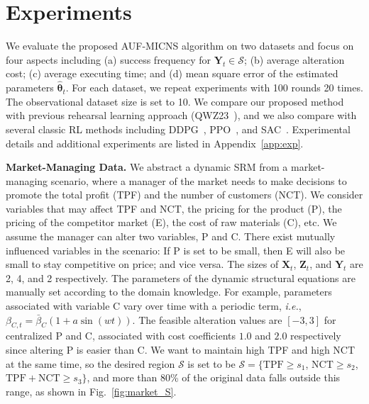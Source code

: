 \documentclass{article}
\theoremstyle{plain}
\theoremstyle{definition}
\theoremstyle{remark}
\def \ie {\textit{i.e.}}
\def \Fig {Fig.}
\def \Z {\mathbf{Z}}
\def \sS {\mathcal{S}}
\def \X {\mathbf{X}}
\def \Y {\mathbf{Y}}
\begin{document}
\section{Experiments}
\label{sec:exper}

We evaluate the proposed AUF-MICNS algorithm on two datasets and focus on four aspects including 
(a) success frequency for $\Y_t\in \sS$; 
(b) average alteration cost; 
(c) average executing time; and
(d) mean square error of the estimated parameters $\hat{\bm{\theta}}_t$. 
For each dataset, we repeat experiments with 100 rounds 20 times. 
The observational dataset size is set to 10. 
We compare our proposed method with previous rehearsal learning approach (QWZ23~\citep{qint2023srm}), 
and we also compare with several classic RL methods including 
DDPG~\citep{Lillicrap2016ddpg}, 
PPO~\citep{John2017PPO}, 
and SAC~\citep{haarnoja2018SAC}.
Experimental details and additional experiments are listed in Appendix~\ref{app:exp}.

\textbf{Market-Managing Data.} 
We abstract a dynamic SRM from a market-managing scenario, where a manager of the market needs to make decisions to promote the total profit (TPF) and the number of customers (NCT). 
We consider variables that may affect TPF and NCT, the pricing for the product (P), the pricing of the competitor market (E), the cost of raw materials (C), etc. 
We assume the manager can alter two variables, P and C.
There exist mutually influenced variables in the scenario: If P is set to be small, then E will also be small to stay competitive on price; and vice versa.
The sizes of $\X_t$, $\Z_t$, and $\Y_t$ are 2, 4, and 2 respectively. 
The parameters of the dynamic structural equations are manually set according to the domain knowledge. 
For example, parameters associated with variable C vary over time with a periodic term, \ie, $\beta_{C,t} = \bar{\beta}_C(1 + a\sin(wt))$. 
The feasible alteration values are $[-3, 3]$ for centralized P and C, associated with cost coefficients $1.0$ and $2.0$ respectively since altering P is easier than C. 
We want to maintain high TPF and high NCT at the same time, so the desired region $\sS$ is set to be $\sS = \{\text{TPF}\geq s_1$, $\text{NCT}\geq s_2$, $\text{TPF}+\text{NCT}\geq s_3\}$, and more than 80\% of the original data falls outside this range, as shown in \Fig~\ref{fig:market_S}.
\end{document}
